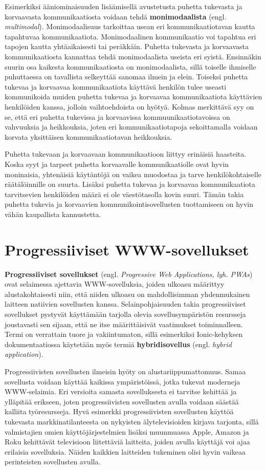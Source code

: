 \documentclass[utf8]{gradu3}
\begin{document}
Esimerkiksi ääniominaisuuden lisäämisellä avustetusta puhetta tukevasta ja korvaavasta kommunikaatiosta voidaan tehdä \textbf{monimodaalista} (engl. \textit{multimodal}). Monimodaalisuus tarkoittaa usean eri kommunikaatiotavan kautta tapahtuvaa kommunikaatiota. Monimodaalinen kommunikaatio voi tapahtua eri tapojen kautta yhtäaikaisesti tai peräkkäin. Puhetta tukevasta ja korvaavasta kommunikaatiosta kannattaa tehdä monimodaalista useista eri syistä. Ensinnäkin suurin osa kaikesta kommunikaatiosta on monimodaalista, sillä toiselle ihmiselle puhuttaessa on tavallista selkeyttää sanomaa ilmein ja elein. Toiseksi puhetta tukevaa ja korvaavaa kommunikaatiota käyttävä henkilön tulee useasti kommunikoida muiden puhetta tukevaa ja korvaavaa kommunikaatiota käyttävien henkilöiden kanssa, jolloin vaihtoehdoista on hyötyä. Kolmas merkittävä syy on se, että eri puhetta tukevissa ja korvaavissa kommuunikaatiotavoissa on vahvuuksia ja heikkouksia, joten eri kommunikaatiotapoja sekoittamalla voidaan korvata yksittäisen kommunikaatiotavan heikkouksia. \parencite[]{AAC-conditional-use}

Puhetta tukevaan ja korvaavaan kommunikaatioon liittyy erinäisiä haasteita. Koska syyt ja tarpeet puhetta korvaavalle kommunikaatiolle ovat hyvin moninaisia, yhtenäisiä käytäntöjä on vaikea muodostaa ja tarve henkilökohtaiselle räätälöinnille on suurta. Lisäksi puhetta tukevaa ja korvaavaa kommunikaatiota tarvitsevien henkilöiden määrä ei ole väestötasolla kovin suuri. Tämän takia puhetta tukevia ja korvaavien kommunikointisovellusten tuottamiseen on hyvin vähän kaupallista kannustetta.

\section{Progressiiviset WWW-sovellukset}

\textbf{Progressiiviset sovellukset} (engl. \textit{Progressive Web Applications, lyh. PWAs}) ovat selaimessa ajettavia WWW-sovelluksia, joiden ulkoasu määrittyy alustakohtaisesti niin, että niiden ulkoasu on mahdollisimman yhdenmukainen laitteen natiivien sovellusten kanssa. Selainpohjaisuuden takia progressiiviset sovellukset pystyvät käyttämään tarjolla olevia sovellusympäristön resursseja joustavasti sen sijaan, että ne itse määrittäisivät vaatimukset toiminnalleen. Termi on verrattain tuore ja vakiintumaton, sillä esimerkiksi Ionic-kehyksen dokumentaatiossa käytetään myös termiä \textbf{hybridisovellus} (engl. \textit{hybrid application}).

Progressiivisten sovellusten ilmeisin hyöty on alustariippumattomuus. Samaa sovellusta voidaan käyttää kaikissa ympäristöissä, jotka tukevat moderneja WWW-selaimia. Eri versioita samasta sovelluksesta ei tarvitse kehittää ja ylläpitää erikseen, joten progressiivisten sovellusten avulla voidaan säästää kalliita työresursseja. Hyvä esimerkki progressiivisten sovellusten käyttöä tukevasta markkinatilanteesta on nykyisten älytelevisioiden kirjava tarjonta, sillä valmistajien omien käyttöjärjestelmien lisäksi muunmuassa Apple, Amazon ja Roku kehittävät televisioon liitettäviä laitteita, joiden avulla käyttäjä voi ajaa erilaisia sovelluksia. Näiden kaikkien laitteiden tukeminen olisi hyvin vaikeaa perinteisten sovellusten avulla. \parencite[]{frankston-pwa}
\end{document}

